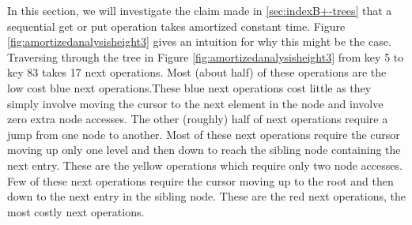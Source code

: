 In this section, we will investigate the claim made in \ref{sec:indexB+-trees} that a sequential get or put operation takes amortized constant time. Figure \ref{fig:amortizedanalysisheight3} gives an intuition for why this might be the case. Traversing through the tree in Figure \ref{fig:amortizedanalysisheight3} from key 5 to key 83 takes 17 next operations. Most (about half) of these  operations are the low cost blue next operations.These blue next operations cost little as they simply involve moving the cursor to the next element in the node and involve zero extra node accesses. The other (roughly) half of next operations require a jump from one node to another. Most of these next operations require the cursor moving up only one level and then down to reach the sibling node containing the next entry. These are the yellow operations which require only two node accesses. Few of these next operations require the cursor moving up to the root and then down to the next entry in the sibling node. These are the red next operations, the most costly next operations.



